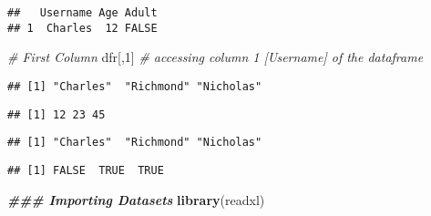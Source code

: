 \documentclass[
]{article}
\newenvironment{Shaded}{\begin{snugshade}}{\end{snugshade}}
\newcommand{\CommentTok}[1]{\textcolor[rgb]{0.56,0.35,0.01}{\textit{#1}}}
\newcommand{\DecValTok}[1]{\textcolor[rgb]{0.00,0.00,0.81}{#1}}
\newcommand{\DocumentationTok}[1]{\textcolor[rgb]{0.56,0.35,0.01}{\textbf{\textit{#1}}}}
\newcommand{\FunctionTok}[1]{\textcolor[rgb]{0.13,0.29,0.53}{\textbf{#1}}}
\newcommand{\NormalTok}[1]{#1}
\newcommand{\SpecialCharTok}[1]{\textcolor[rgb]{0.81,0.36,0.00}{\textbf{#1}}}
\begin{document}
\begin{verbatim}
##   Username Age Adult
## 1  Charles  12 FALSE
\end{verbatim}

\begin{Shaded}
\begin{Highlighting}[]
\CommentTok{\# First Column}
\NormalTok{dfr[,}\DecValTok{1}\NormalTok{] }\CommentTok{\# accessing column 1 [Username] of the dataframe}
\end{Highlighting}
\end{Shaded}

\begin{verbatim}
## [1] "Charles"  "Richmond" "Nicholas"
\end{verbatim}

\begin{Shaded}
\end{Shaded}

\begin{verbatim}
## [1] 12 23 45
\end{verbatim}

\begin{Shaded}
\end{Shaded}

\begin{verbatim}
## [1] "Charles"  "Richmond" "Nicholas"
\end{verbatim}

\begin{Shaded}
\end{Shaded}

\begin{verbatim}
## [1] FALSE  TRUE  TRUE
\end{verbatim}

\begin{Shaded}
\begin{Highlighting}[]
\DocumentationTok{\#\#\# Importing Datasets}
\FunctionTok{library}\NormalTok{(readxl)}
\end{Highlighting}
\end{Shaded}
\end{document}
